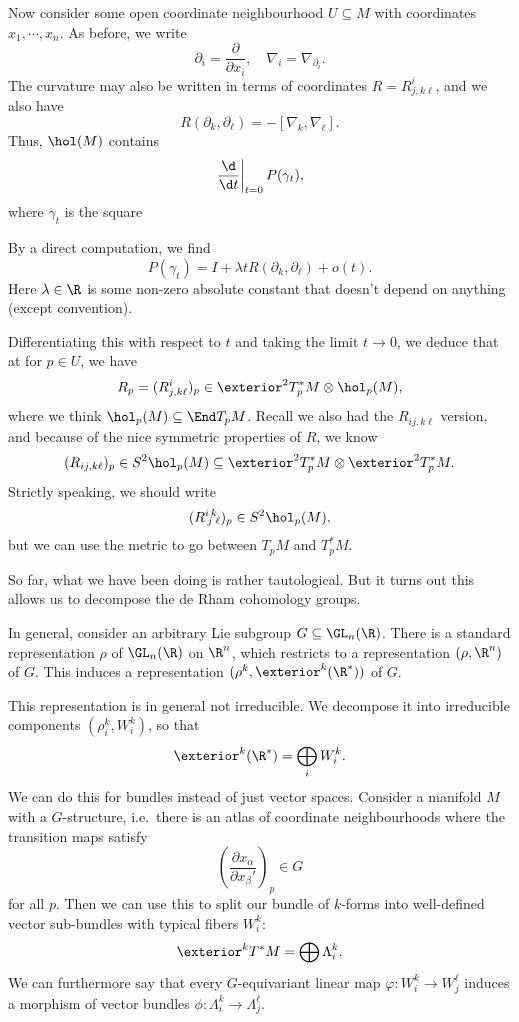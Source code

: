 \documentclass[a4paper]{article}
\begin{document}
Now consider some open coordinate neighbourhood $U \subseteq M$ with coordinates $x_1, \cdots, x_n$. As before, we write
\[
  \partial_i = \frac{\partial}{\partial x_i},\quad \nabla_i = \nabla_{\partial_i}.
\]
The curvature may also be written in terms of coordinates $R = R^i_{j,k\ell}$, and we also have
\[
  R(\partial_k, \partial_\ell) = - [\nabla_k, \nabla_\ell].
\]
Thus, $\hol(M)$ contains
\[
  \left.\frac{\d}{\d t} \right|_{t = 0} P(\gamma_t),
\]
where $\gamma_t$ is the square
\begin{center}
\end{center}
By a direct computation, we find
\[
  P(\gamma_t) = I + \lambda t R(\partial_k, \partial_\ell) + o(t).
\]
Here $\lambda\in \R$ is some non-zero absolute constant that doesn't depend on anything (except convention).

Differentiating this with respect to $t$ and taking the limit $t\to 0$, we deduce that at for $p \in U$, we have
\[
  R_p = (R^i_{j, k\ell})_p \in \exterior^2 T^*_p M \otimes \hol_p(M),
\]
where we think $\hol_p(M) \subseteq \End T_p M$. Recall we also had the $R_{ij, k\ell}$ version, and because of the nice symmetric properties of $R$, we know
\[
  (R_{ij, k\ell})_p \in S^2 \hol_p(M) \subseteq \exterior^2 T^*_p M \otimes \exterior^2 T_p^* M.
\]
Strictly speaking, we should write
\[
  (R^i\!_j\!^k\!_\ell)_p \in S^2 \hol_p(M),
\]
but we can use the metric to go between $T_pM$ and $T^*_p M$.

So far, what we have been doing is rather tautological. But it turns out this allows us to decompose the de Rham cohomology groups.

In general, consider an arbitrary Lie subgroup $G \subseteq \GL_n(\R)$. There is a standard representation $\rho$ of $\GL_n(\R)$ on $\R^n$, which restricts to a representation $(\rho, \R^n)$ of $G$. This induces a representation $(\rho^k, \exterior^k(\R^*))$ of $G$.

This representation is in general not irreducible. We decompose it into irreducible components $(\rho^k_i, W_i^k)$, so that
\[
  \exterior^k(\R^*) = \bigoplus_i W_i^k.
\]
We can do this for bundles instead of just vector spaces. Consider a manifold $M$ with a $G$-structure, i.e.\ there is an atlas of coordinate neighbourhoods where the transition maps satisfy
\[
  \left(\frac{\partial x_\alpha}{\partial x_\beta'}\right)_p \in G
\]
for all $p$. Then we can use this to split our bundle of $k$-forms into well-defined vector sub-bundles with typical fibers $W_i^k$:
\[
  \exterior^k T^* M = \bigoplus \Lambda^k_i.
\]
We can furthermore say that every $G$-equivariant linear map $\varphi: W_i^k \to W_j^\ell$ induces a morphism of vector bundles $\phi: \Lambda_i^k \to \Lambda_j^\ell$.
\end{document}
